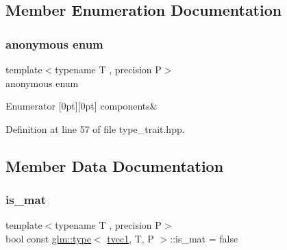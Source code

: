 \subsection{Member Enumeration Documentation}
\mbox{\label{structglm_1_1type_3_01tvec1_00_01_t_00_01_p_01_4_a801d6fb0c96187fb37eb20ffe0342732}} 
\subsubsection{\texorpdfstring{anonymous enum}{anonymous enum}}
{\footnotesize\ttfamily template$<$typename T , precision P$>$ \\
anonymous enum}

\begin{DoxyEnumFields}{Enumerator}
[0pt][0pt]{}\mbox{\label{structglm_1_1type_3_01tvec1_00_01_t_00_01_p_01_4_a801d6fb0c96187fb37eb20ffe0342732a74d2b822bba98b221d517a69a40459f7}} 
components&\\
\hline

\end{DoxyEnumFields}


Definition at line 57 of file type\+\_\+trait.\+hpp.



\subsection{Member Data Documentation}
\mbox{\label{structglm_1_1type_3_01tvec1_00_01_t_00_01_p_01_4_adbe064ba8e73ecdd44594a3544d31101}} 
\subsubsection{\texorpdfstring{is\_mat}{is\_mat}}
{\footnotesize\ttfamily template$<$typename T , precision P$>$ \\
bool const \mbox{\hyperlink{structglm_1_1type}{glm\+::type}}$<$ \mbox{\hyperlink{structglm_1_1tvec1}{tvec1}}, T, P $>$\+::is\+\_\+mat = false\hspace{0.3cm}{\ttfamily [static]}}



